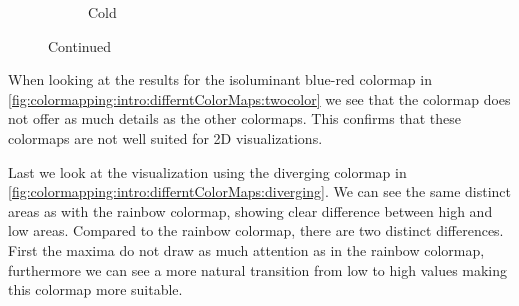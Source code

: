 \begin{figure}[htb]
\begin{subfigure}{0.35\textwidth}
		\caption{
		Cold
		}
		\label{fig:colormapping:intro:differntColorMaps:cold}
	\end{subfigure}
\caption{Continued}
\end{figure}
When looking at the results for the isoluminant blue-red colormap in \cref{fig:colormapping:intro:differntColorMaps:twocolor} we see that the colormap does not offer as much details as the other colormaps. This confirms that these colormaps are not well suited for 2D visualizations. 

Last we look at the visualization using the  diverging colormap in \cref{fig:colormapping:intro:differntColorMaps:diverging}. We can see the same distinct areas as with the rainbow colormap, showing clear difference between high and low areas. Compared to the rainbow colormap, there are two distinct differences. First the maxima do not draw as much attention as in the rainbow colormap, furthermore we can see a more natural transition from low to high values making this colormap more suitable.


